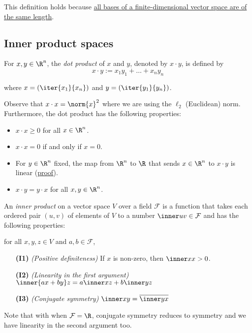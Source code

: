This definition holds because \href{c1f28cf}{all bases of a finite-dimensional
vector space are of the same length}.

\subsection{Inner product spaces}\label{b44db9c}

\label{ba82373}

For $x,y\in\R^n$, the \textit{dot product} of $x$ and $y$, denoted by $x\cdot
y$, is defined by
$$
  x\cdot y:=x_1y_1+\ldots+x_ny_n
$$

where $x=(\iter{x_1}{x_n})$ and $y=(\iter{y_1}{y_n})$.

Observe that $x\cdot x=\norm{x}^2$ where we are using the $\ell_2$ (Euclidean)
norm. Furthermore, the dot product has the following properties:
\begin{itemize}
  \item $x\cdot x\geq0$ for all $x\in\R^n$.
  \item $x\cdot x=0$ if and only if $x=0$.
  \item For $y\in\R^n$ fixed, the map from $\R^n$ to $\R$ that sends $x\in\R^n$
        to $x\cdot y$ is linear (\href{dcae040}{proof}).
  \item $x\cdot y=y\cdot x$ for all $x,y\in\R^n$.
\end{itemize}

\label{cebd07a}

An \textit{inner product} on a vector space $V$ over a field $\mathcal F$ is a
function that takes each ordered pair $(u,v)$ of elements of $V$ to a number
$\inner uv\in\mathcal F$ and has the following properties:

for all $x,y,z\in V$ and $a,b\in\mathcal F$,
\begin{enumerate}
  \item[\textbf{(I1)}] \textit{(Positive definiteness)} If $x$ is
        non-zero, then $\inner xx>0$.
  \item[\textbf{(I2)}] \textit{(Linearity in the first argument)}
        $\inner{ax+by}z=a\inner xz+b\inner yz$
  \item[\textbf{(I3)}] \textit{(Conjugate symmetry)}
        $\inner xy=\overline{\inner yx}$
\end{enumerate}

Note that with when $\mathcal F=\R$, conjugate symmetry reduces to symmetry and
we have linearity in the second argument too.

